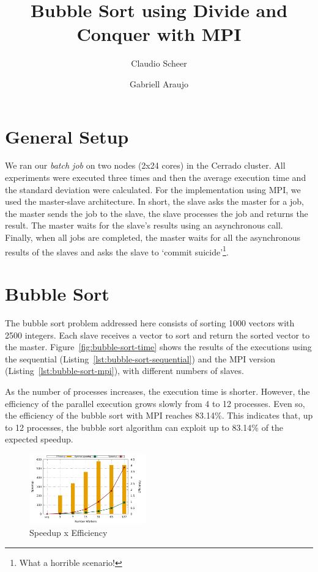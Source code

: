 \documentclass[10pt,twocolumn]{article}
\begin{document}
\title{\vspace{-1cm}Bubble Sort using Divide and Conquer with MPI}
\author[1]{Claudio Scheer}
\author[1]{Gabriell Araujo}
\date{}

\maketitle

\section*{General Setup}
We ran our \textit{batch job} on two nodes (2x24 cores) in the Cerrado cluster. All experiments were executed three times and then the average execution time and the standard deviation were calculated. For the implementation using MPI, we used the master-slave architecture. In short, the slave asks the master for a job, the master sends the job to the slave, the slave processes the job and returns the result. The master waits for the slave's results using an asynchronous call. Finally, when all jobs are completed, the master waits for all the asynchronous results of the slaves and asks the slave to `commit suicide'\footnote{What a horrible scenario!}.

\section*{Bubble Sort}
The bubble sort problem addressed here consists of sorting 1000 vectors with 2500 integers. Each slave receives a vector to sort and return the sorted vector to the master. Figure~\ref{fig:bubble-sort-time} shows the results of the executions using the sequential (Listing~\ref{lst:bubble-sort-sequential}) and the MPI version (Listing~\ref{lst:bubble-sort-mpi}), with different numbers of slaves.

As the number of processes increases, the execution time is shorter. However, the efficiency of the parallel execution grows slowly from 4 to 12 processes. Even so, the efficiency of the bubble sort with MPI reaches 83.14\%. This indicates that, up to 12 processes, the bubble sort algorithm can exploit up to 83.14\% of the expected speedup.

\begin{figure}[ht]
	\centering
	\includegraphics[width=0.45\textwidth]{../logs/scripts/bubble-sort-speedup-efficiency.pdf}
	\caption{Speedup x Efficiency}
	\label{fig:bubble-sort-speedup-efficiency}
\end{figure}
\end{document}
